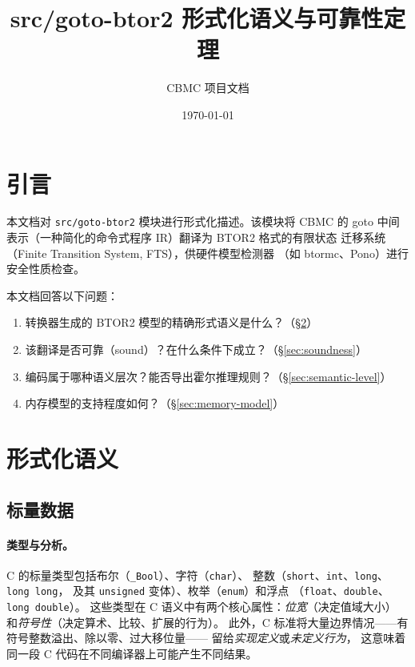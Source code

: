 \documentclass[11pt,a4paper]{article}
\title{\bfseries src/goto-btor2 形式化语义与可靠性定理}
\author{CBMC 项目文档}
\date{\today}
\begin{document}
\maketitle
\tableofcontents

\section{引言}

本文档对 \texttt{src/goto-btor2} 模块进行形式化描述。该模块将 CBMC 的
goto 中间表示（一种简化的命令式程序 IR）翻译为 BTOR2 格式的有限状态
迁移系统（Finite Transition System, FTS），供硬件模型检测器
（如 btormc、Pono）进行安全性质检查。

本文档回答以下问题：
\begin{enumerate}[label=(\arabic*)]
  \item 转换器生成的 BTOR2 模型的精确形式语义是什么？（\S\ref{sec:semantics}）
  \item 该翻译是否可靠（sound）？在什么条件下成立？（\S\ref{sec:soundness}）
  \item 编码属于哪种语义层次？能否导出霍尔推理规则？（\S\ref{sec:semantic-level}）
  \item 内存模型的支持程度如何？（\S\ref{sec:memory-model}）
\end{enumerate}

\section{形式化语义}
\label{sec:semantics}

\subsection{标量数据}
\label{sec:scalar}

\paragraph{类型与分析。}
C 的标量类型包括布尔（\texttt{\_Bool}）、字符（\texttt{char}）、
整数（\texttt{short}、\texttt{int}、\texttt{long}、\texttt{long long}，
及其 \texttt{unsigned} 变体）、枚举（\texttt{enum}）和浮点
（\texttt{float}、\texttt{double}、\texttt{long double}）。
这些类型在 C 语义中有两个核心属性：\emph{位宽}（决定值域大小）
和\emph{符号性}（决定算术、比较、扩展的行为）。
此外，C 标准将大量边界情况——有符号整数溢出、除以零、过大移位量——
留给\emph{实现定义}或\emph{未定义行为}，
这意味着同一段 C 代码在不同编译器上可能产生不同结果。
\end{document}
